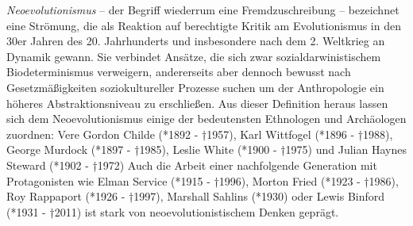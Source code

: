 \documentclass[openany,twoside,twocolumn]{book}
\begin{document}
\emph{Neoevolutionismus} -- der Begriff wiederrum eine Fremdzuschreibung
-- bezeichnet eine Strömung, die als Reaktion auf berechtigte Kritik am
Evolutionismus in den 30er Jahren des 20. Jahrhunderts und insbesondere
nach dem 2. Weltkrieg an Dynamik gewann. Sie verbindet Ansätze, die sich
zwar sozialdarwinistischem Biodeterminismus verweigern, andererseits
aber dennoch bewusst nach Gesetzmäßigkeiten soziokultureller Prozesse
suchen um der Anthropologie ein höheres Abstraktionsniveau zu
erschließen. Aus dieser Definition heraus lassen sich dem
Neoevolutionismus einige der bedeutensten Ethnologen und Archäologen
zuordnen: Vere Gordon Childe (*1892 - †1957), Karl Wittfogel (*1896 -
†1988), George Murdock (*1897 - †1985), Leslie White (*1900 - †1975) und
Julian Haynes Steward (*1902 - †1972) Auch die Arbeit einer nachfolgende
Generation mit Protagonisten wie Elman Service (*1915 - †1996), Morton
Fried (*1923 - †1986), Roy Rappaport (*1926 - †1997), Marshall Sahlins
(*1930) oder Lewis Binford (*1931 - †2011) ist stark von
neoevolutionistischem Denken geprägt.
\end{document}
